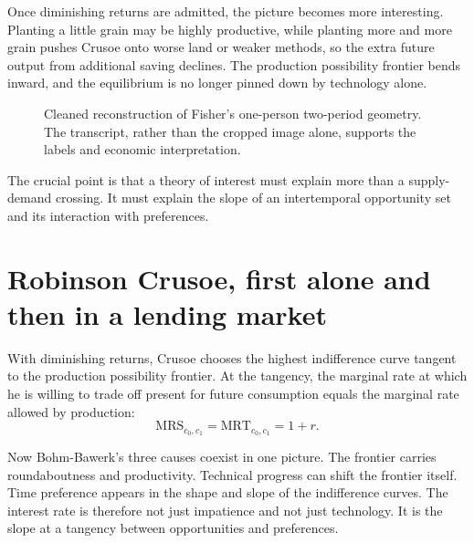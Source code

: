 Once diminishing returns are admitted, the picture becomes more interesting. Planting a little grain may be highly productive, while planting more and more grain pushes Crusoe onto worse land or weaker methods, so the extra future output from additional saving declines. The production possibility frontier bends inward, and the equilibrium is no longer pinned down by technology alone.

\begin{figure}[t]
\centering
{}
\caption{Cleaned reconstruction of Fisher's one-person two-period geometry. The transcript, rather than the cropped image alone, supports the labels and economic interpretation.}
\end{figure}

The crucial point is that a theory of interest must explain more than a supply-demand crossing. It must explain the slope of an intertemporal opportunity set and its interaction with preferences.

\section{Robinson Crusoe, first alone and then in a lending market}

With diminishing returns, Crusoe chooses the highest indifference curve tangent to the production possibility frontier. At the tangency, the marginal rate at which he is willing to trade off present for future consumption equals the marginal rate allowed by production:
\begin{equation}
\mathrm{MRS}_{c_0,c_1}=\mathrm{MRT}_{c_0,c_1}=1+r.
\end{equation}

Now Bohm-Bawerk's three causes coexist in one picture. The frontier carries roundaboutness and productivity. Technical progress can shift the frontier itself. Time preference appears in the shape and slope of the indifference curves. The interest rate is therefore not just impatience and not just technology. It is the slope at a tangency between opportunities and preferences.

